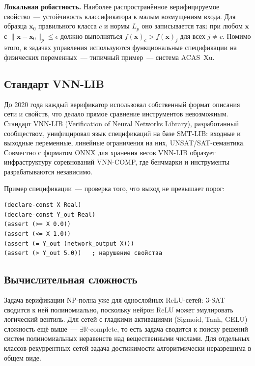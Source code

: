 \textbf{Локальная робастность.}
Наиболее распространённое верифицируемое свойство~--- устойчивость классификатора
к малым возмущениям входа. Для образца $\mathbf{x}_0$ правильного класса $c$
и нормы $L_p$ оно записывается так: при любом
$\mathbf{x}$ с $\|\mathbf{x} - \mathbf{x}_0\|_p \le \epsilon$ должно выполняться
$f(\mathbf{x})_c > f(\mathbf{x})_j$ для всех $j \neq c$\cite{DBLP:journals/corr/abs-2002-03339}.
Помимо этого, в задачах управления используются функциональные спецификации
на физических переменных~--- типичный пример~--- система ACAS~Xu\cite{Demarchi2023SupportingStandardization}.

\subsection*{Стандарт VNN-LIB}

До 2020 года каждый верификатор использовал собственный формат описания сети
и свойств, что делало прямое сравнение инструментов невозможным.
Стандарт VNN-LIB (Verification of Neural Networks Library), разработанный
сообществом, унифицировал язык спецификаций на базе SMT-LIB: входные и
выходные переменные, линейные ограничения на них, UNSAT/SAT-семантика\cite{VNNLIBWebsite}.
Совместно с форматом ONNX для хранения весов VNN-LIB образует инфраструктуру
соревнований VNN-COMP, где бенчмарки и инструменты разрабатываются независимо\cite{arXiv2212VNNCOMP2022}.

Пример спецификации~--- проверка того, что выход не превышает порог:
\begin{lstlisting}[caption={Пример VNN-LIB спецификации},label={lst:smtlib}]
(declare-const X Real)
(declare-const Y_out Real)
(assert (>= X 0.0))
(assert (<= X 1.0))
(assert (= Y_out (network_output X)))
(assert (> Y_out 5.0))   ; нарушение свойства
\end{lstlisting}

\subsection*{Вычислительная сложность}

Задача верификации NP-полна уже для однослойных ReLU-сетей: 3-SAT сводится
к ней полиномиально, поскольку нейрон ReLU может эмулировать логический
вентиль\cite{arXiv2403RobustnessVerification}.
Для сетей с гладкими активациями (Sigmoid, Tanh, GELU) сложность ещё выше~---
$\exists\mathbb{R}$-complete, то есть задача сводится к поиску решений
систем полиномиальных неравенств над вещественными числами\cite{NeurIPS2021ExistsRComplete}.
Для отдельных классов рекуррентных сетей задача достижимости алгоритмически
неразрешима в общем виде\cite{IJCAI2018ReachabilityDNN}.


